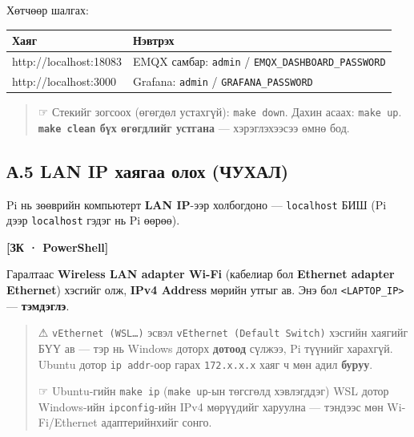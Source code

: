 Хөтчөөр шалгах:

\begingroup\scriptsize\begin{longtable}[]{@{}ll@{}}
\toprule
Хаяг & Нэвтрэх\tabularnewline
\midrule
\endhead
http://localhost:18083 & EMQX самбар: \texttt{admin} / \texttt{EMQX\_\allowbreak{}DASHBOARD\_\allowbreak{}PASSWORD}\tabularnewline
http://localhost:3000 & Grafana: \texttt{admin} / \texttt{GRAFANA\_\allowbreak{}PASSWORD}\tabularnewline
\bottomrule
\end{longtable}\endgroup

\begin{quote}
☞ Стекийг зогсоох (өгөгдөл устахгүй): \texttt{make\ down}. Дахин асаах: \texttt{make\ up}. \textbf{\texttt{make\ clean} бүх өгөгдлийг устгана} --- хэрэглэхээсээ өмнө бод.
\end{quote}

\hypertarget{ux430.5-lan-ip-ux445ux430ux44fux433ux430ux430-ux43eux43bux43eux445-ux447ux443ux445ux430ux43b}{%
\subsection{А.5 LAN IP хаягаа олох (ЧУХАЛ)}\label{ux430.5-lan-ip-ux445ux430ux44fux433ux430ux430-ux43eux43bux43eux445-ux447ux443ux445ux430ux43b}}

Pi нь зөөврийн компьютерт \textbf{LAN IP}-ээр холбогдоно --- \texttt{localhost} БИШ (Pi дээр \texttt{localhost} гэдэг нь Pi өөрөө).

\textbf{{[}ЗК · PowerShell{]}}

\begin{Shaded}
\begin{Highlighting}[]
\end{Highlighting}
\end{Shaded}

Гаралтаас \textbf{Wireless LAN adapter Wi-Fi} (кабелиар бол \textbf{Ethernet adapter Ethernet}) хэсгийг олж, \textbf{IPv4 Address} мөрийн утгыг ав. Энэ бол \texttt{\textless{}LAPTOP\_\allowbreak{}IP\textgreater{}} --- \textbf{тэмдэглэ}.

\begin{quote}
⚠ \texttt{vEthernet\ (WSL\ldots{})} эсвэл \texttt{vEthernet\ (Default\ Switch)} хэсгийн хаягийг БҮҮ ав --- тэр нь Windows доторх \textbf{дотоод} сүлжээ, Pi түүнийг харахгүй. Ubuntu дотор \texttt{ip\ addr}-оор гарах \texttt{172.x.x.x} хаяг ч мөн адил \textbf{буруу}.

☞ Ubuntu-гийн \texttt{make\ ip} (\texttt{make\ up}-ын төгсгөлд хэвлэгддэг) WSL дотор Windows-ийн \texttt{ipconfig}-ийн IPv4 мөрүүдийг харуулна --- тэндээс мөн Wi-Fi/Ethernet адаптерийнхийг сонго.
\end{quote}

